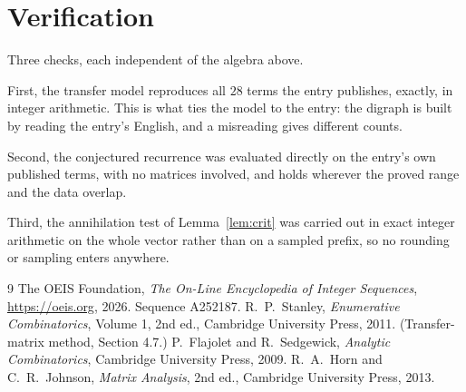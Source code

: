 \documentclass[11pt,a4paper]{article}
\theoremstyle{plain}
\theoremstyle{definition}
\begin{document}
\section{Verification}

Three checks, each independent of the algebra above.

First, the transfer model reproduces all $28$ terms the entry publishes, exactly, in
integer arithmetic. This is what ties the model to the entry: the digraph is built by reading
the entry's English, and a misreading gives different counts.

Second, the conjectured recurrence was evaluated directly on the entry's own published terms,
with no matrices involved, and holds wherever the proved range and the data overlap.

Third, the annihilation test of Lemma~\ref{lem:crit} was carried out in exact integer
arithmetic on the whole vector rather than on a sampled prefix, so no rounding or sampling
enters anywhere.

\begin{thebibliography}{9}
 The OEIS Foundation, \emph{The On-Line Encyclopedia of Integer
Sequences}, \url{https://oeis.org}, 2026. Sequence A252187.
 R.~P.~Stanley, \emph{Enumerative Combinatorics}, Volume 1, 2nd ed.,
Cambridge University Press, 2011. (Transfer-matrix method, Section 4.7.)
 P.~Flajolet and R.~Sedgewick, \emph{Analytic Combinatorics}, Cambridge
University Press, 2009.
 R.~A.~Horn and C.~R.~Johnson, \emph{Matrix Analysis}, 2nd ed., Cambridge
University Press, 2013.
\end{thebibliography}
\end{document}
